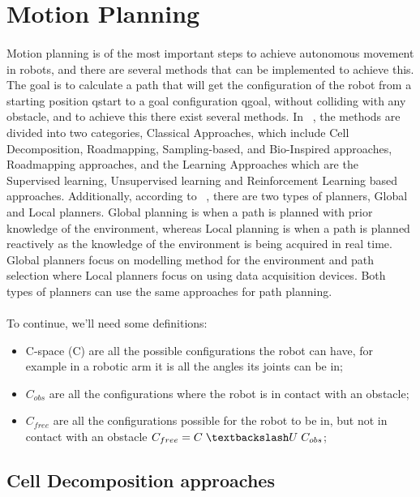 \section{Motion Planning}
\label{sec:MP}
\paragraph{}Motion planning is of the most important steps to achieve autonomous movement in robots, and there are several methods that can be implemented to achieve this.
The goal is to calculate a path that will get the configuration of the robot from a starting position qstart to a goal configuration qgoal, without colliding 
with any obstacle, and to achieve this there exist several methods.
In ~\cite{tamizi2023review, LIU2023120254}, the methods are divided into two categories, Classical Approaches, which include Cell Decomposition, Roadmapping, Sampling-based, and 
Bio-Inspired approaches, Roadmapping approaches, and the Learning Approaches which are the Supervised learning, Unsupervised learning and Reinforcement Learning based approaches. 
Additionally, according to ~\cite{LIU2023120254}, there are two types of planners, Global and Local planners. Global planning is when a path is planned with prior 
knowledge of the environment, whereas Local planning is when a path is planned reactively as the knowledge of the environment is being acquired in real time. 
Global planners focus on modelling method for the environment and path selection where Local planners focus on using data acquisition devices. 
Both types of planners can use the same approaches for path planning. 
\\
\\
To continue, we'll need some definitions:
\begin{itemize}
   \item C-space (C) are all the possible configurations the robot can have, for example in a robotic arm it is all the angles its joints can be in;
   \item $C_{obs}$ are all the configurations where the robot is in contact with an obstacle;
   \item $C_{free}$ are all the configurations possible for the robot to be in, but not in contact with an obstacle $C_{free}  = C \hspace{0.1cm}\textbackslash U\hspace{0.1cm} C_{obs}$;
\end{itemize}

\subsection{Cell Decomposition approaches}
\label{subsec:CD}
